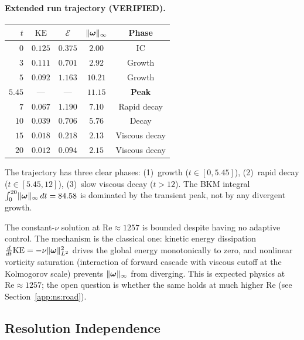 \paragraph{Extended run trajectory (VERIFIED).}
\begin{center}
\begin{tabular}{@{}rcccc@{}}
\toprule
$t$ & $\mathrm{KE}$ & $\mathcal{E}$ &
  $\lVert \bm{\omega} \rVert_\infty$ & Phase \\
\midrule
$0$    & $0.125$ & $0.375$  & $2.00$  & IC \\
$3$    & $0.111$ & $0.701$  & $2.92$  & Growth \\
$5$    & $0.092$ & $1.163$  & $10.21$ & Growth \\
$5.45$ & ---     & ---      & $11.15$ & \textbf{Peak} \\
$7$    & $0.067$ & $1.190$  & $7.10$  & Rapid decay \\
$10$   & $0.039$ & $0.706$  & $5.76$  & Decay \\
$15$   & $0.018$ & $0.218$  & $2.13$  & Viscous decay \\
$20$   & $0.012$ & $0.094$  & $2.15$  & Viscous decay \\
\bottomrule
\end{tabular}
\end{center}
The trajectory has three clear phases: (1)~growth
($t \in [0, 5.45]$), (2)~rapid decay ($t \in [5.45, 12]$),
(3)~slow viscous decay ($t > 12$).  The BKM integral
$\int_0^{20}\lVert \bm{\omega} \rVert_\infty\,dt = 84.58$ is
dominated by the transient peak, not by any divergent growth.

\begin{remark}
\label{rem:boundedness_mechanism}
The constant-$\nu$ solution at $\mathrm{Re} \approx 1257$
is bounded despite having no adaptive control.  The
mechanism is the classical one: kinetic energy dissipation
$\frac{d}{dt}\mathrm{KE} = -\nu\lVert \bm{\omega} \rVert_{L^2}^2$
drives the global energy monotonically to zero, and
nonlinear vorticity saturation (interaction of forward
cascade with viscous cutoff at the Kolmogorov scale)
prevents $\lVert \bm{\omega} \rVert_\infty$ from diverging.
This is expected physics at $\mathrm{Re} \approx 1257$;
the open question is whether the same holds at much
higher Re (see Section~\ref{app:ns:road}).
\end{remark}

\subsection{Resolution Independence}
\label{app:ns:resolution}

